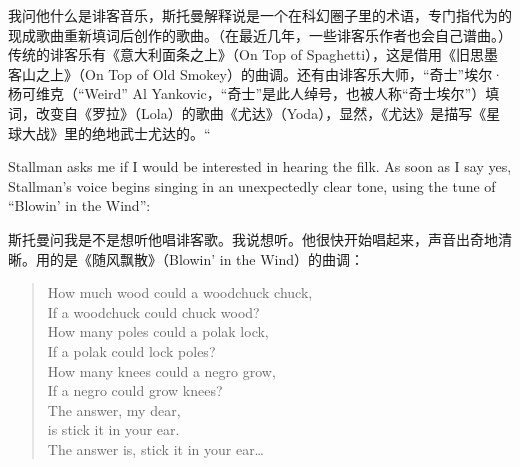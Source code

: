 \ifdefined\chs
我问他什么是诽客音乐，斯托曼解释说是一个在科幻圈子里的术语，专门指代为的现成歌曲重新填词后创作的歌曲。（在最近几年，一些诽客乐作者也会自己谱曲。）传统的诽客乐有《意大利面条之上》（On Top of Spaghetti），这是借用《旧思墨客山之上》（On Top of Old Smokey）的曲调。还有由诽客乐大师，``奇士''埃尔·杨可维克（``Weird'' Al Yankovic，``奇士''是此人绰号，也被人称``奇士埃尔''）填词，改变自《罗拉》（Lola）的歌曲《尤达》（Yoda），显然，《尤达》是描写《星球大战》里的绝地武士尤达的。``
\fi

\ifdefined\eng
Stallman asks me if I would be interested in hearing the filk. As soon as I say yes, Stallman's voice begins singing in an unexpectedly clear tone, using the tune of ``Blowin' in the Wind'':
\fi

\ifdefined\chs
斯托曼问我是不是想听他唱诽客歌。我说想听。他很快开始唱起来，声音出奇地清晰。用的是《随风飘散》（Blowin' in the Wind）的曲调：
\fi

\ifdefined\eng
\begin{verse}
How much wood could a woodchuck chuck,\\
If a woodchuck could chuck wood?\\
How many poles could a polak lock,\\
If a polak could lock poles?\\
How many knees could a negro grow,\\
If a negro could grow knees?\\
The answer, my dear,\\
is stick it in your ear.\\
The answer is, stick it in your ear\ldots
\end{verse}
\fi

